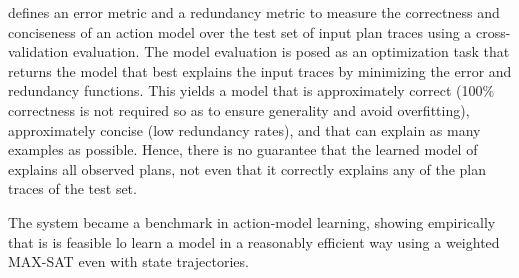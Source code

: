 \ARMS defines an error metric and a redundancy metric to measure the correctness and conciseness of an action model over the test set of input plan traces using a cross-validation evaluation. The model evaluation is posed as an optimization task that returns the model that best explains the input traces by minimizing the error and redundancy functions. This yields a model that is approximately correct (100\% correctness is not required so as to ensure generality and avoid overfitting), approximately concise (low redundancy rates), and that can explain as many examples as possible. Hence, there is no guarantee that the learned model of \ARMS explains all observed plans, not even that it correctly explains any of the plan traces of the test set.

The \ARMS system became a benchmark in action-model learning, showing empirically that is is feasible lo learn a model in a reasonably efficient way using a weighted MAX-SAT even with \NO state trajectories.

